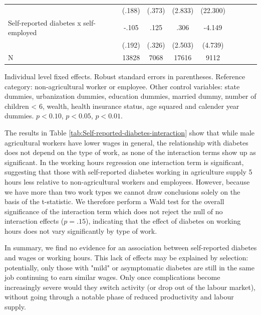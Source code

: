 \begin{table}[!ht]
\begin{center}
\begin{adjustbox}{max width=\textwidth}
\begin{threeparttable}
{\begin{tabular}{l*{4}{SS}}
                &   (.188)         &   (.373)         &  (2.833)         & (22.300)         \\
Self-reported diabetes x self-employed& -.105         &     .125         &     .306         &   -4.149         \\
                &   (.192)         &   (.326)         &  (2.503)         &  (4.739)         \\
\midrule
N               &    13828         &     7068         &    17616         &     9112         \\
\bottomrule
\end{tabular}
\begin{tablenotes}
\item Individual level fixed effects. Robust standard errors in parentheses. Reference category: non-agricultural worker or employee. Other control variables: state dummies, urbanization dummies, education dummies, married dummy, number of children < 6, wealth, health insurance status, age squared and calender year dummies. \sym{*} \(p<0.10\), \sym{**} \(p<0.05\), \sym{***} \(p<0.01\).
\end{tablenotes}
}
\end{threeparttable}
\end{adjustbox}
\end{center}
\end{table}


\FloatBarrier
  
The results in Table \ref{tab:Self-reported-diabetes-interaction} show that while male agricultural workers have lower wages in general, the relationship with diabetes does not depend on the type of work, as none of the interaction terms show up as significant. In the working hours regression one interaction term is significant, suggesting that those with self-reported diabetes working in agriculture supply 5 hours less relative to non-agricultural workers and employees. However, because we have more than two work types we cannot draw conclusions
solely on the basis of the t-statistic. We therefore perform a Wald test for the overall significance of the interaction term which does
not reject the null of no interaction effects ($p = .15$), indicating that the effect of diabetes on working hours does not vary significantly by type of work. 

In summary, we find no evidence for an association between self-reported diabetes and wages or working hours. This lack of effects may be explained by selection: potentially, only those with "mild" or asymptomatic diabetes are still in the same job continuing to earn similar wages. Only once complications become increasingly severe would they switch activity (or drop out of the labour market), without going through a notable phase of reduced productivity and labour supply.

